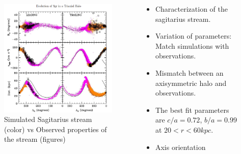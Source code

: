 \documentclass[xcolor=dvipsnames]{beamer}
\begin{document}
\begin{frame}

\begin{columns}[c]

\begin{column}{.5\textwidth}
\begin{figure}
\includegraphics[width=1\linewidth]{./pics/sagStream.png}
\caption{\tiny Simulated Sagitarius stream (color) vs Observed properties of the stream (figures)}
\end{figure}
\end{column}

\begin{column}{.6\textwidth}
\centering
\small
\begin{itemize}

\item Characterization of the sagitarius stream.

\item Variation of parameters: Match simulations with observations.

\item Mismatch between an axisymmetric halo and observations.

\item The best fit parameters are $c/a = 0.72$, $b/a = 0.99$ at $20<r<60 kpc$. 

\item Axis orientation

\end{itemize}

\end{column}

\end{columns}

\end{frame}
\end{document}
